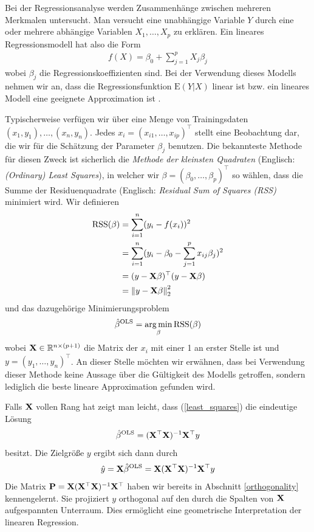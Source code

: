 Bei der Regressionsanalyse werden Zusammenhänge zwischen
mehreren Merkmalen untersucht. Man versucht eine unabhängige Variable $Y$ durch eine oder mehrere abhängige Variablen $X_1, \ldots, X_p$ zu erklären. Ein lineares Regressionsmodell hat also die Form
\begin{align}
\label{linear_model}
f(X) = \beta_0 + \sum_{j=1}^p X_j\beta_j
\end{align}
wobei $\beta_j$ die Regressionskoeffizienten sind. Bei der Verwendung dieses Modells nehmen wir an, dass die Regressionsfunktion $\text{E}(Y|X)$ linear ist bzw. ein lineares Modell eine geeignete Approximation ist \cite{hastie_elements}.

Typischerweise verfügen wir über eine Menge von Trainingsdaten $(x_1, y_1), \ldots, (x_n, y_n)$. Jedes $x_i = (x_{i1}, \ldots, x_{ip})^{\top}$ stellt eine Beobachtung dar, die wir für die Schätzung der Parameter $\beta_j$ benutzen. Die bekannteste Methode für diesen Zweck ist sicherlich die \textit{Methode der kleinsten Quadraten} (Englisch: \textit{(Ordinary) Least Squares}), in welcher wir $\beta = (\beta_0, \ldots, \beta_p)^{\top}$ so wählen, dass die Summe der Residuenquadrate (Englisch: \textit{Residual Sum of Squares (RSS)} minimiert wird. Wir definieren
\begin{align}
\label{RSS}
\text{RSS}(\beta) & = \sum_{i=1}^{n}(y_i - f(x_i))^2\\
& = \sum_{i=1}^{n}(y_i - \beta_0 - \sum_{j=1}^p x_{ij}\beta_j)^2\nonumber\\
& = (y - \mathbf{X} \beta)^{\top}(y-\mathbf{X} \beta)\nonumber\\
& = \left\lVert y - \mathbf{X} \beta \right\rVert_{2}^{2}\nonumber
\end{align}
und das dazugehörige Minimierungsproblem
\begin{align}
\label{least_squares}
\hat{\beta}^{\text{OLS}} = \operatorname*{arg\,min}_{\beta} \text{RSS}(\beta)
\end{align}
wobei $\mathbf{X} \in \mathbb{R}^{n \times (p+1)}$ die Matrix der $x_i$ mit einer 1 an erster Stelle ist und $y = (y_1, \ldots, y_n)^{\top}$. An dieser Stelle möchten wir erwähnen, dass bei Verwendung dieser Methode keine Aussage über die Gültigkeit des Modells getroffen, sondern lediglich die beste lineare Approximation gefunden wird.

Falls $\mathbf{X}$ vollen Rang hat zeigt man leicht, dass (\ref{least_squares}) die eindeutige Lösung
\begin{align}
\hat{\beta}^{\text{OLS}} = (\mathbf{X}^{\top}\mathbf{X})^{-1}\mathbf{X}^{\top} y
\end{align}
besitzt. Die Zielgröße $y$ ergibt sich dann durch
\begin{align}
\hat{y} = \mathbf{X} \hat{\beta}^{\text{OLS}} = \mathbf{X} (\mathbf{X}^{\top}\mathbf{X})^{-1}\mathbf{X}^{\top} y
\end{align}
Die Matrix $\mathbf{P} = \mathbf{X} (\mathbf{X}^{\top}\mathbf{X})^{-1}\mathbf{X}^{\top}$ haben wir bereits in Abschnitt \ref{orthogonality} kennengelernt. Sie projiziert $y$ orthogonal auf den durch die Spalten von $\mathbf{X}$ aufgespannten Unterraum. Dies ermöglicht eine geometrische Interpretation der linearen Regression.

